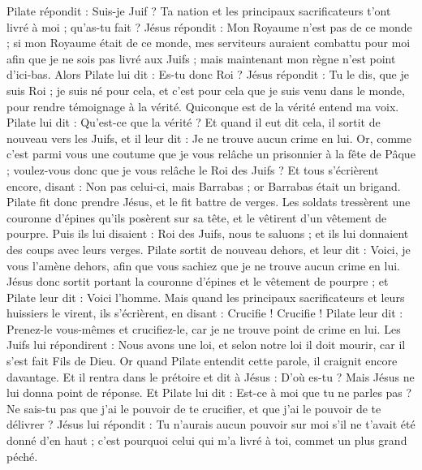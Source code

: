 \begin{multicols}{2}
Pilate répondit : Suis-je Juif ? Ta nation et les principaux sacrificateurs t'ont livré à moi ; qu'as-tu fait ?
Jésus répondit : Mon Royaume n'est pas de ce monde ; si mon Royaume était de ce monde, mes serviteurs auraient combattu pour moi afin que je ne sois pas livré aux Juifs ; mais maintenant mon règne n'est point d'ici-bas.
Alors Pilate lui dit : Es-tu donc Roi ? Jésus répondit : Tu le dis, que je suis Roi ; je suis né pour cela, et c'est pour cela que je suis venu dans le monde, pour rendre témoignage à la vérité. Quiconque est de la vérité entend ma voix.
Pilate lui dit : Qu'est-ce que la vérité ? Et quand il eut dit cela, il sortit de nouveau vers les Juifs, et il leur dit : Je ne trouve aucun crime en lui.
Or, comme c'est parmi vous une coutume que je vous relâche un prisonnier à la fête de Pâque ; voulez-vous donc que je vous relâche le Roi des Juifs ?
Et tous s'écrièrent encore, disant : Non pas celui-ci, mais Barrabas ; or Barrabas était un brigand.
\VerseOne{}Pilate fit donc prendre Jésus, et le fit battre de verges.
Les soldats tressèrent une couronne d'épines qu'ils posèrent sur sa tête, et le vêtirent d'un vêtement de pourpre.
Puis ils lui disaient : Roi des Juifs, nous te saluons ; et ils lui donnaient des coups avec leurs verges.
Pilate sortit de nouveau dehors, et leur dit : Voici, je vous l'amène dehors, afin que vous sachiez que je ne trouve aucun crime en lui.
Jésus donc sortit portant la couronne d'épines et le vêtement de pourpre ; et Pilate leur dit : Voici l'homme.
Mais quand les principaux sacrificateurs et leurs huissiers le virent, ils s'écrièrent, en disant : Crucifie ! Crucifie ! Pilate leur dit : Prenez-le vous-mêmes et crucifiez-le, car je ne trouve point de crime en lui.
Les Juifs lui répondirent : Nous avons une loi, et selon notre loi il doit mourir, car il s'est fait Fils de Dieu.
Or quand Pilate entendit cette parole, il craignit encore davantage.
Et il rentra dans le prétoire et dit à Jésus : D'où es-tu ? Mais Jésus ne lui donna point de réponse.
Et Pilate lui dit : Est-ce à moi que tu ne parles pas ? Ne sais-tu pas que j'ai le pouvoir de te crucifier, et que j'ai le pouvoir de te délivrer ?
Jésus lui répondit : Tu n'aurais aucun pouvoir sur moi s'il ne t'avait été donné d'en haut ; c'est pourquoi celui qui m'a livré à toi, commet un plus grand péché.

\end{multicols}
